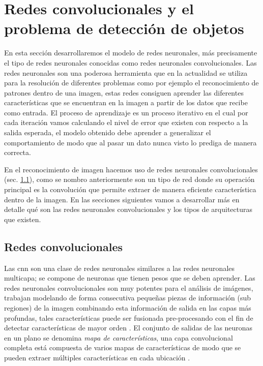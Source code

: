 \section{Redes convolucionales y el problema de detección de objetos}\label{sec:compueter-vision}

En esta sección desarrollaremos el modelo de redes neuronales, más precisamente el tipo de  redes neuronales conocidas como redes neuronales convolucionales. Las redes neuronales son una poderosa herramienta que en la actualidad se utiliza para la resolución de diferentes problemas como por ejemplo el reconocimiento de patrones dentro de una imagen, estas redes consiguen aprender las diferentes características que se encuentran en la imagen a partir de los datos que recibe como entrada. El proceso de aprendizaje es un proceso iterativo en el cual por cada iteración vamos calculando el nivel de error que existen con respecto a la salida esperada, el modelo obtenido debe aprender a generalizar el comportamiento de modo que al pasar un dato nunca visto lo prediga de manera correcta. 

En el reconocimiento de imagen  hacemos uso de redes neuronales convolucionales (sec. \ref{sub:cnn}), como se nombro anteriormente son un tipo de red donde su operación principal es la convolución que permite extraer de manera eficiente característica dentro de la imagen. En las secciones siguientes vamos a desarrollar más en detalle qué son las redes neuronales convolucionales y los tipos de arquitecturas que existen. 


\subsection{Redes convolucionales}\label{sub:cnn}

Las \ac{cnn} son una clase de redes neuronales  similares a las redes neuronales multicapa; se compone de neuronas que tienen pesos que se deben aprender. Las redes neuronales convolucionales son muy potentes para el análisis de imágenes, trabajan modelando de forma consecutiva pequeñas piezas de información (sub regiones) de la imagen combinando esta información de salida en las capas más profundas, tales características puede ser fusionada pre-procesando con el fin de detectar características de mayor orden \citep{murphy}. El conjunto de salidas de las neuronas en un plano se denomina \textit{mapa de características}, una capa convolucional completa está compuesta de varios mapas de características de modo que se pueden extraer múltiples características en cada ubicación \citep{cnns}.

